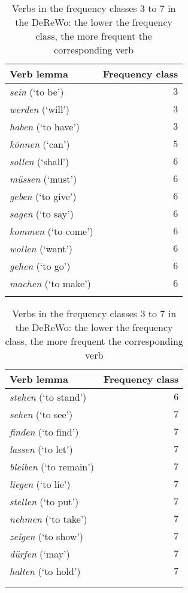 \begin{table}[b]
\small
\caption[Verb frequencies according to DeReWo]{Verbs in the frequency classes 3 to 7 in the DeReWo: the lower the frequency class, the more frequent the corresponding verb}
\centering
\hfill
\begin{tabular}{@{}l@{}r}
\lsptoprule
{Verb lemma} & Frequency class \\
\midrule
\textit{sein} (`to be') & $3$ \\
\textit{werden} (`will') & $3$ \\
\textit{haben} (`to have') & $3$ \\
\textit{können} (`can') & $5$ \\
\textit{sollen} (`shall') & $6$ \\
\textit{müssen} (`must') & $6$ \\
\textit{geben} (`to give') & $6$ \\
\textit{sagen} (`to say') & $6$ \\
\textit{kommen} (`to come') & $6$ \\
\textit{wollen} (`want') & $6$ \\
\textit{gehen} (`to go') & $6$ \\
\textit{machen} (`to make') & $6$\\
\lspbottomrule
\end{tabular}
\hfill
\begin{tabular}{l@{}r@{}}
\lsptoprule
{Verb lemma} & Frequency class \\
\midrule
\textit{stehen} (`to stand') & $6$ \\
\textit{sehen} (`to see') & $7$ \\
\textit{finden} (`to find') & $7$ \\
\textit{lassen} (`to let') & $7$ \\
\textit{bleiben} (`to remain') & $7$ \\
\textit{liegen} (`to lie') & $7$ \\
\textit{stellen} (`to put') & $7$ \\
\textit{nehmen} (`to take') & $7$ \\
\textit{zeigen} (`to show') & $7$ \\
\textit{dürfen} (`may') & $7$ \\
\textit{halten} (`to hold') & $7$ \\
\\
\lspbottomrule
\end{tabular}
\hfill
\label{tab:verb.freq}
\end{table}


